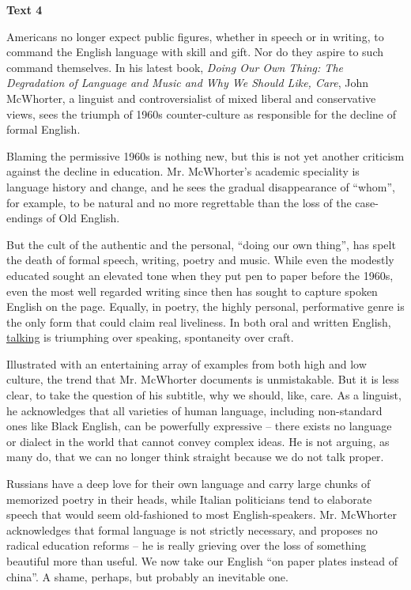 
\begin{center}\textbf{Text 4}\end{center}

\qquad Americans no longer expect public figures, whether in speech or in writing, to command the English language with skill and gift. Nor do they aspire to such command themselves. In his latest book, \emph{Doing Our Own Thing: The Degradation of Language and Music and Why We Should Like, Care}, John McWhorter, a linguist and controversialist of mixed liberal and conservative views, sees the triumph of 1960s counter-culture as responsible for the decline of formal English.

\qquad Blaming the permissive 1960s is nothing new, but this is not yet another criticism against the decline in education. Mr. McWhorter's academic speciality is language history and change, and he sees the gradual disappearance of ``whom'', for example, to be natural and no more regrettable than the loss of the case-endings of Old English.

\qquad But the cult of the authentic and the personal, ``doing our own thing'', has spelt the death of formal speech, writing, poetry and music. While even the modestly educated sought an elevated tone when they put pen to paper before the 1960s, even the most well regarded writing since then has sought to capture spoken English on the page. Equally, in poetry, the highly personal, performative genre is the only form that could claim real liveliness. In both oral and written English, \ul{talking} is triumphing over speaking, spontaneity over craft.

\qquad Illustrated with an entertaining array of examples from both high and low culture, the trend that Mr. McWhorter documents is unmistakable. But it is less clear, to take the question of his subtitle, why we should, like, care. As a linguist, he acknowledges that all varieties of human language, including non-standard ones like Black English, can be powerfully expressive -- there exists no language or dialect in the world that cannot convey complex ideas. He is not arguing, as many do, that we can no longer think straight because we do not talk proper.

\qquad Russians have a deep love for their own language and carry large chunks of memorized poetry in their heads, while Italian politicians tend to elaborate speech that would seem old-fashioned to most English-speakers. Mr. McWhorter acknowledges that formal language is not strictly necessary, and proposes no radical education reforms -- he is really grieving over the loss of something beautiful more than useful. We now take our English ``on paper plates instead of china''. A shame, perhaps, but probably an inevitable one.


